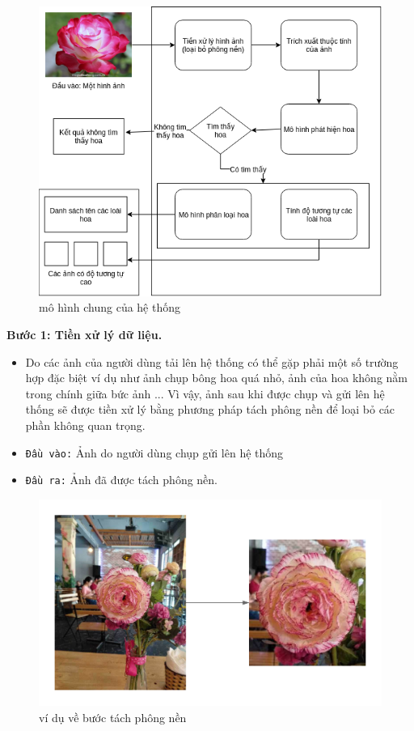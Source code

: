 \documentclass[12pt]{report}
\begin{document}
		\begin{figure}[h]
			\centering
			\includegraphics[scale=0.81]{mohinhchung}
			\caption{mô hình chung của hệ thống}
			\label{fig:mohinhchung}
		\end{figure}
														
		\textbf{Bước 1: Tiền xử lý dữ liệu.} 
		\begin{itemize}
			\item Do các ảnh của người dùng tải lên hệ thống có thể gặp phải một số trường hợp đặc biệt ví dụ như ảnh chụp bông hoa quá nhỏ, ảnh của hoa không nằm trong chính giữa bức ảnh ... Vì vậy, ảnh sau khi được chụp và gửi lên hệ thống sẽ được tiền xử lý bằng phương pháp tách phông nền để loại bỏ các phần không quan trọng.
			\item \texttt{Đầu vào:} Ảnh do người dùng chụp gửi lên hệ thống
			\item \texttt{Đầu ra:} Ảnh đã được tách phông nền.
		\end{itemize}
														
		\begin{figure}[h]
			\centering
			\includegraphics[scale=0.4]{tach_phong_nen}
			\caption{ví dụ về bước tách phông nền}
			\label{fig:tach_phong_nen}
		\end{figure}
														
\end{document}
